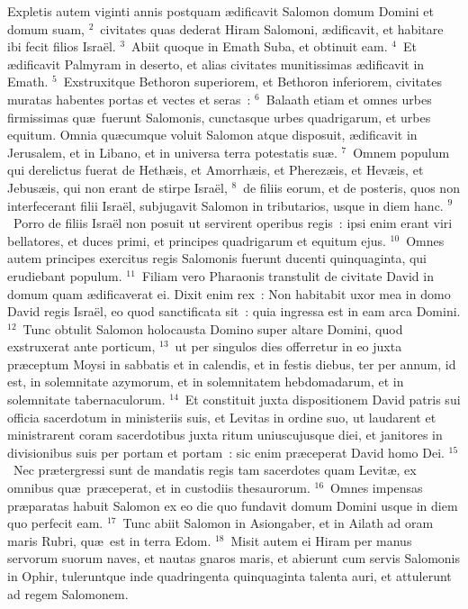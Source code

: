 \bchapter
\lettrine[lines=3,image=true,loversize=0.05,lraise=-0.03]{E}{}xpletis autem viginti annis postquam \ae dificavit Salomon domum Domini et domum suam,
${}^{2}$~civitates quas dederat Hiram Salomoni, \ae dificavit, et habitare ibi fecit filios Isra\"el.
${}^{3}$~Abiit quoque in Emath Suba, et obtinuit eam.
${}^{4}$~Et \ae dificavit Palmyram in deserto, et alias civitates munitissimas \ae dificavit in Emath.
${}^{5}$~Exstruxitque Bethoron superiorem, et Bethoron inferiorem, civitates muratas habentes portas et vectes et seras~:
${}^{6}$~Balaath etiam et omnes urbes firmissimas qu\ae\ fuerunt Salomonis, cunctasque urbes quadrigarum, et urbes equitum. Omnia qu\ae cumque voluit Salomon atque disposuit, \ae dificavit in Jerusalem, et in Libano, et in universa terra potestatis su\ae .
${}^{7}$~Omnem populum qui derelictus fuerat de Heth\ae is, et Amorrh\ae is, et Pherez\ae is, et Hev\ae is, et Jebus\ae is, qui non erant de stirpe Isra\"el,
${}^{8}$~de filiis eorum, et de posteris, quos non interfecerant filii Isra\"el, subjugavit Salomon in tributarios, usque in diem hanc.
${}^{9}$~Porro de filiis Isra\"el non posuit ut servirent operibus regis~: ipsi enim erant viri bellatores, et duces primi, et principes quadrigarum et equitum ejus.
${}^{10}$~Omnes autem principes exercitus regis Salomonis fuerunt ducenti quinquaginta, qui erudiebant populum.
${}^{11}$~Filiam vero Pharaonis transtulit de civitate David in domum quam \ae dificaverat ei. Dixit enim rex~: Non habitabit uxor mea in domo David regis Isra\"el, eo quod sanctificata sit~: quia ingressa est in eam arca Domini.
${}^{12}$~Tunc obtulit Salomon holocausta Domino super altare Domini, quod exstruxerat ante porticum,
${}^{13}$~ut per singulos dies offerretur in eo juxta pr\ae ceptum Moysi in sabbatis et in calendis, et in festis diebus, ter per annum, id est, in solemnitate azymorum, et in solemnitatem hebdomadarum, et in solemnitate tabernaculorum.
${}^{14}$~Et constituit juxta dispositionem David patris sui officia sacerdotum in ministeriis suis, et Levitas in ordine suo, ut laudarent et ministrarent coram sacerdotibus juxta ritum uniuscujusque diei, et janitores in divisionibus suis per portam et portam~: sic enim pr\ae ceperat David homo Dei.
${}^{15}$~Nec pr\ae tergressi sunt de mandatis regis tam sacerdotes quam Levit\ae , ex omnibus qu\ae\ pr\ae ceperat, et in custodiis thesaurorum.
${}^{16}$~Omnes impensas pr\ae paratas habuit Salomon ex eo die quo fundavit domum Domini usque in diem quo perfecit eam.
${}^{17}$~Tunc abiit Salomon in Asiongaber, et in Ailath ad oram maris Rubri, qu\ae\ est in terra Edom.
${}^{18}$~Misit autem ei Hiram per manus servorum suorum naves, et nautas gnaros maris, et abierunt cum servis Salomonis in Ophir, tuleruntque inde quadringenta quinquaginta talenta auri, et attulerunt ad regem Salomonem.

